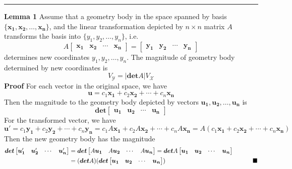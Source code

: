 \documentclass[11pt]{article}
\begin{document}
\rule{\textwidth}{0.3mm} \par
\textbf{Lemma 1} Assume that a geometry body in the space spanned by basis $\{\bm{x_1}, \bm{x_2}, \dots, \bm{x_n}\}$, and the linear transformation depicted by $n\times n$ matrix $A$ transforms the basis into $\{y_1,y_2,\dots,y_n\}$, i.e.
\begin{equation}
    A \begin{bmatrix}
    \bm{x_1} & \bm{x_2} & \cdots & \bm{x_n}
    \end{bmatrix} =\begin{bmatrix}
    \bm{y_1} & \bm{y_2} & \cdots & \bm{y_n}
    \end{bmatrix}
\end{equation}
determines new coordinates $y_1, y_2, \dots, y_n$. The magnitude of geometry body determined by new coordinates is
\begin{equation}
    V_{\mathcal{Y}} = |\bm{det}A| V_{\mathcal{X}}
\end{equation}
\textbf{Proof} For each vector in the original space, we have
\begin{equation}
    \bm{u} = c_1\bm{x_1} + c_2 \bm{x_2} + \cdots + c_n\bm{x_n} 
\end{equation}
Then the magnitude to the geometry body depicted by vectors $\bm{u_1}, \bm{u_2}, \dots, \bm{u_n}$ is
\begin{equation}
    \bm{det}\begin{bmatrix}
    \bm{u_1} & \bm{u_2} & \cdots & \bm{u_n}
    \end{bmatrix} 
\end{equation}
For the transformed vector, we have
\begin{equation}
    \bm{u}' = c_1\bm{y_1} + c_2 \bm{y_2} + \cdots + c_n\bm{y_n} = c_1A\bm{x_1} + c_2A\bm{x_2} + \cdots + c_nA\bm{x_n} = A(c_1\bm{x_1} + c_2 \bm{x_2} + \cdots + c_n\bm{x_n} ) 
\end{equation}
Then the new geometry body has the magnitude
\begin{equation}
\begin{aligned}
    \bm{det} \begin{bmatrix}
    \bm{u_1}' & \bm{u_2}' & \cdots & \bm{u_n}' \end{bmatrix} &= \bm{det} \begin{bmatrix}
    A\bm{u_1} & A\bm{u_2} & \cdots & A\bm{u_n}
    \end{bmatrix} = \bm{det} A\begin{bmatrix}
    \bm{u_1} & \bm{u_2} & \cdots & \bm{u_n}
    \end{bmatrix} \\
    &=(\bm{det}A)(\bm{det}\begin{bmatrix}
    \bm{u_1} & \bm{u_2} & \cdots & \bm{u_n}
    \end{bmatrix})\notag~~~~~~~~~~~~~~~~~~~~~~~~~~~~~~~~~~~~~~~~~~~\blacksquare
\end{aligned}
\end{equation}
\end{document}

